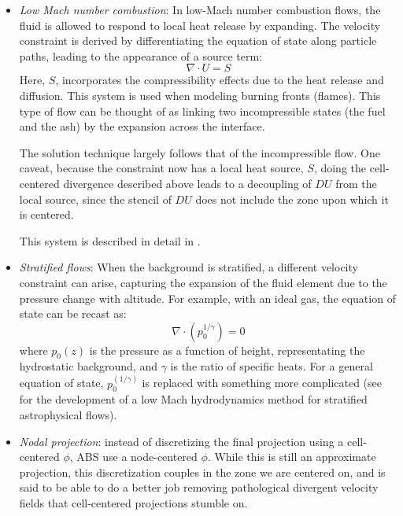 \begin{itemize}
\item {\em Low Mach number combustion}: In low-Mach number combustion
  flows, the fluid is allowed to respond to local heat release 
  by expanding.  The velocity constraint is derived by differentiating
  the equation of state along particle paths, leading to the appearance
  of a source term:
  \begin{equation}
  \nabla \cdot U = S
  \end{equation}
  Here, $S$, incorporates the compressibility effects due to the 
  heat release and diffusion.  This system is used when modeling
  burning fronts (flames).  This type of flow can be thought
  of as linking two incompressible states (the fuel and the ash)
  by the expansion across the interface.

  The solution technique largely follows that of the incompressible
  flow.  One caveat, because the constraint now has a local heat
  source, $S$, doing the cell-centered divergence described above
  leads to a decoupling of $DU$ from the local source, since the
  stencil of $DU$ does not include the zone upon which it is centered.

  This system is described in detail in \cite{pember-flame,
    DayBell:2000,SNpaper}.

\item {\em Stratified flows}: When the background is stratified, a
  different velocity constraint can arise, capturing the expansion of
  the fluid element due to the pressure change with altitude.  For example,
  with an ideal gas, the equation of state can be recast as:
  \begin{equation}
  \nabla \cdot (p_0^{1/\gamma}) = 0
  \end{equation}
  where $p_0(z)$ is the pressure as a function of height,
  representating the hydrostatic background, and $\gamma$ is the ratio
  of specific heats.  For a general equation of state,
  $p_0^(1/\gamma)$ is replaced with something more complicated (see
  \cite{ABRZ:I,ABRZ:II,ABNZ:III} for the development of a low Mach
  hydrodynamics method for stratified astrophysical flows).

\item {\em Nodal projection}: instead of discretizing the final projection
  using a cell-centered $\phi$, ABS use a node-centered $\phi$.  While
  this is still an approximate projection, this discretization couples
  in the zone we are centered on, and is said to be able to do a better
  job removing pathological divergent velocity fields that cell-centered
  projections stumble on.

\end{itemize}


